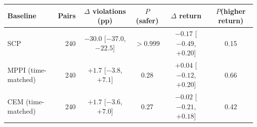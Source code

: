 \begin{tabular}{lrcccc}
\toprule
Baseline & Pairs & $\Delta$ violations (pp) & $P$(safer) & $\Delta$ return & $P$(higher return) \\
\midrule
SCP & 240 & $-30.0$ [$-37.0$, $-22.5$] & $>0.999$ & $-0.17$ [$-0.49$, $+0.20$] & 0.15 \\
MPPI (time-matched) & 240 & $+1.7$ [$-3.8$, $+7.1$] & 0.28 & $+0.04$ [$-0.12$, $+0.20$] & 0.66 \\
CEM (time-matched) & 240 & $+1.7$ [$-3.6$, $+7.0$] & 0.27 & $-0.02$ [$-0.21$, $+0.18$] & 0.42 \\
\bottomrule
\end{tabular}
